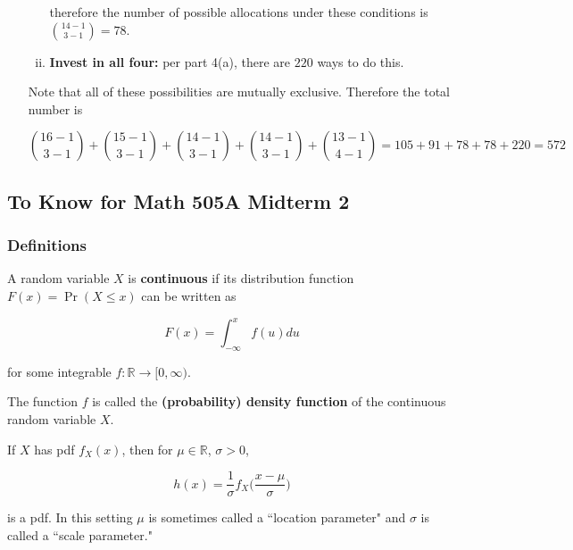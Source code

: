\begin{enumerate}[(a)]
\begin{enumerate}[(i)]
therefore the number of possible allocations under these conditions is \(\binom{14 - 1}{3 - 1} = \boxed{78} \).

\item \textbf{Invest in all four:} per part 4(a), there are \(\boxed{220}\) ways to do this.

\end{enumerate}

Note that all of these possibilities are mutually exclusive. Therefore the total number is 

\[
\binom{16 - 1}{3 - 1} + \binom{15 - 1}{3 - 1} + \binom{14 - 1}{3 - 1} + \binom{14 - 1}{3 - 1} + \binom{13 - 1}{4 - 1} = 105 + 91 + 78 + 78 + 220 = \boxed{572}
\]

\end{enumerate}



%
%
%
%
%
%
%

\subsection{To Know for Math 505A Midterm 2}

\subsubsection{Definitions}

\begin{definition} A random variable \(X\) is \textbf{continuous} if its distribution function \(F(x) = \Pr(X \leq x)\) can be written as 

\[
F(x) = \int_{-\infty}^x f(u) du
\]

for some integrable \(f: \mathbb{R} \to [0, \infty)\). 
\end{definition}

\begin{definition} The function \(f\) is called the \textbf{(probability) density function} of the continuous random variable \(X\). \end{definition} 

\begin{proposition} If \(X\) has pdf \(f_X(x)\), then for \(\mu \in \mathbb{R}\), \(\sigma > 0\),

\[
h(x) = \frac{1}{\sigma} f_X \bigg( \frac{x - \mu}{\sigma} \bigg)
\]

is a pdf. In this setting \(\mu\) is sometimes called a ``location parameter" and \(\sigma\) is called a ``scale parameter."

\end{proposition} 

